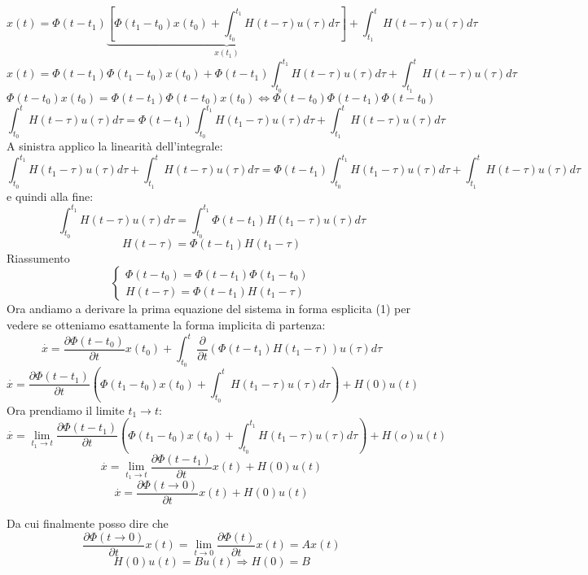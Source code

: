 \documentclass{article}
\begin{document}
\[ x(t) = \Phi(t-t_1)\underbrace{\left[ \Phi(t_1-t_0)x(t_0)+\int_{t_0}^{t_1} H(t-\tau)u(\tau)d\tau\right]}_{x(t_1)}+\int_{t_1}^{t} H(t-\tau)u(\tau)d\tau \]
\[x(t) = \Phi(t-t_1)\Phi(t_1-t_0)x(t_0)+\Phi(t-t_1)\int_{t_0}^{t_1} H(t-\tau)u(\tau)d\tau+\int_{t_1}^{t} H(t-\tau)u(\tau)d\tau\]
\[ \Phi(t-t_0)x(t_0)= \Phi(t-t_1)\Phi(t-t_0)x(t_0)\Longleftrightarrow\Phi(t-t_0)\Phi(t-t_1)\Phi(t-t_0) \]
\[ \int_{t_0}^{t} H(t-\tau)u(\tau)d\tau = \Phi(t-t_1)\int_{t_0}^{t_1} H(t_1-\tau)u(\tau)d\tau+\int_{t_1}^{t} H(t-\tau)u(\tau)d\tau \] 
A sinistra applico la linearità dell'integrale:
\[ \int_{t_0}^{t_1} H(t_1-\tau)u(\tau)d\tau+\int_{t_1}^{t} H(t-\tau)u(\tau)d\tau
 = \Phi(t-t_1)\int_{t_0}^{t_1} H(t_1-\tau)u(\tau)d\tau+\int_{t_1}^{t} H(t-\tau)u(\tau)d\tau \]
e quindi alla fine:
\[ \int_{t_0}^{t_1} H(t-\tau)u(\tau)d\tau = \int_{t_0}^{t_1}\Phi(t-t_1) H(t_1-\tau)u(\tau)d\tau \]
\[ H(t-\tau) = \Phi(t-t_1) H(t_1-\tau) \]
Riassumento
\[\begin{cases} 
        \Phi(t-t_0) = \Phi(t-t_1)\Phi(t_1-t_0)\\
        H(t-\tau) = \Phi(t-t_1) H(t_1-\tau)
\end{cases}
\]
Ora andiamo a derivare la prima equazione del sistema in forma esplicita (1) per vedere se otteniamo
esattamente la forma implicita di partenza:
\[ \overset{\cdot}{x} = \frac{\partial \Phi(t-t_0)}{\partial t}x(t_0)+\int_{t_0}^{t} \frac{\partial}{\partial t}\left( \Phi(t-t_1) H(t_1-\tau)\right)u(\tau)d\tau \]
\[ \overset{\cdot}{x} = \frac{\partial \Phi(t-t_1)}{\partial t}\left(\Phi(t_1-t_0)x(t_0)+\int_{t_0}^{t}H(t_1-\tau)u(\tau)d\tau\right)+H(0)u(t) \]
Ora prendiamo il limite $t_1\to t$:
\[ \overset{\cdot}{x} = \lim_{t_1\to t}\frac{\partial \Phi(t-t_1)}{\partial t}\left(\Phi(t_1-t_0)x(t_0)+\int_{t_0}^{t_1}H(t_1-\tau)u(\tau)d\tau\right)+H(o)u(t) \]
\[ \overset{\cdot}{x} = \lim_{t_1\to t}\frac{\partial \Phi(t-t_1)}{\partial t}x(t)+H(0)u(t) \]
\[ \overset{\cdot}{x} = \frac{\partial \Phi(t\to0)}{\partial t}x(t)+H(0)u(t) \]

Da cui finalmente posso dire che 
\[ \frac{\partial \Phi(t\to 0)}{\partial t}x(t) =\lim_{t\to 0}\frac{\partial \Phi(t)}{\partial t}x(t) = Ax(t) \]
\[ H(0)u(t) = Bu(t) \Rightarrow H(0) = B \]
\end{document}
